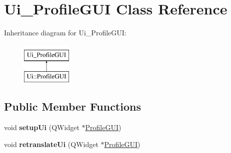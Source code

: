 \hypertarget{classUi__ProfileGUI}{}\section{Ui\+\_\+\+Profile\+G\+UI Class Reference}
\label{classUi__ProfileGUI}
Inheritance diagram for Ui\+\_\+\+Profile\+G\+UI\+:\begin{figure}[H]
\begin{center}
\leavevmode
\includegraphics[height=2.000000cm]{classUi__ProfileGUI}
\end{center}
\end{figure}
\subsection*{Public Member Functions}
\begin{DoxyCompactItemize}
\item 
void {\bfseries setup\+Ui} (Q\+Widget $\ast$\hyperlink{classProfileGUI}{Profile\+G\+UI})\hypertarget{classUi__ProfileGUI_aa7e52899deabb412419caacc81f664dd}{}\label{classUi__ProfileGUI_aa7e52899deabb412419caacc81f664dd}

\item 
void {\bfseries retranslate\+Ui} (Q\+Widget $\ast$\hyperlink{classProfileGUI}{Profile\+G\+UI})\hypertarget{classUi__ProfileGUI_a86cd94ad2c3eb8b894f0bc4408a6058c}{}\label{classUi__ProfileGUI_a86cd94ad2c3eb8b894f0bc4408a6058c}

\end{DoxyCompactItemize}
